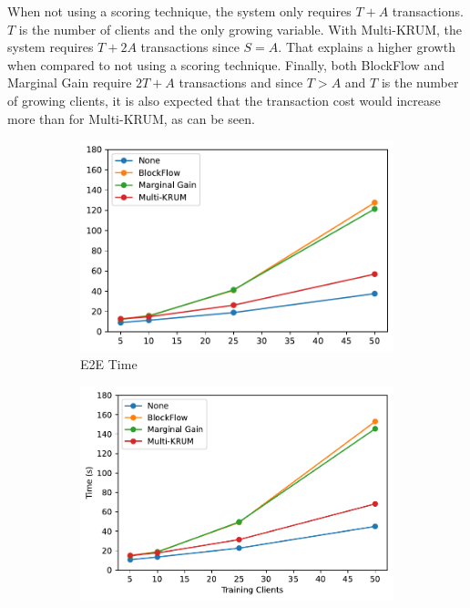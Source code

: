 When not using a scoring technique, the system only requires $T+A$ transactions. $T$ is the number of clients and the only growing variable. With Multi-KRUM, the system requires $T+2A$ transactions since $S=A$. That explains a higher growth when compared to not using a scoring technique. Finally, both BlockFlow and Marginal Gain require $2T+A$ transactions and since $T > A$ and $T$ is the number of growing clients, it is also expected that the transaction cost would increase more than for Multi-KRUM, as can be seen.

\begin{figure}[!ht]
    \centering
    \begin{subfigure}[b]{0.49\textwidth}
        \centering
        \includegraphics[width=\textwidth]{graphics/clients/e2e.pdf}
        \caption{E2E Time}
    \end{subfigure}
    \hfill
    \begin{subfigure}[b]{0.49\textwidth}
        \centering
        \includegraphics[width=\textwidth]{graphics/clients/round.pdf}

\end{subfigure}
\end{figure}
